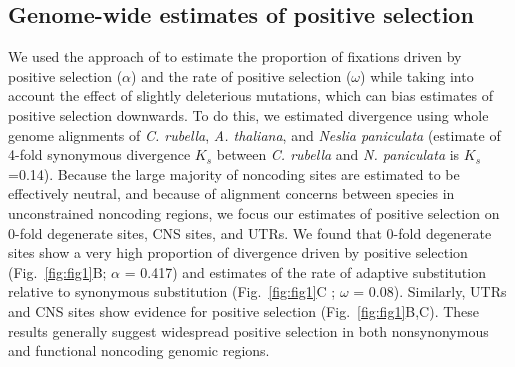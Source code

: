 \subsection{Genome-wide estimates of positive selection} 
We used the approach of \citet{Eyre-Walker2009-zt} to estimate the proportion of fixations driven by positive selection ($\alpha$) and the rate of positive selection ($\omega$) while taking into account the effect of slightly deleterious mutations, which can bias estimates of positive selection downwards. To do this, we estimated divergence using whole genome alignments of \textit{C. rubella}, \textit{A. thaliana}, and \textit{Neslia paniculata} (estimate of 4-fold synonymous divergence $K_{s}$ between \textit{C. rubella} and \textit{N. paniculata} is $K_{s}$=0.14). Because the large majority of noncoding sites are estimated to be effectively neutral, and because of alignment concerns between species in unconstrained noncoding regions, we focus our estimates of positive selection on 0-fold degenerate sites, CNS sites, and UTRs. We found that 0-fold degenerate sites show a very high proportion of divergence driven by positive selection  (Fig.~\ref{fig:fig1}B; $\alpha$ = 0.417) and estimates of the rate of adaptive substitution relative to synonymous substitution (Fig.~\ref{fig:fig1}C ; $\omega$ = 0.08). Similarly, UTRs and CNS sites show evidence for positive selection (Fig.~\ref{fig:fig1}B,C). These results generally suggest widespread positive selection in both nonsynonymous and functional noncoding genomic regions.


